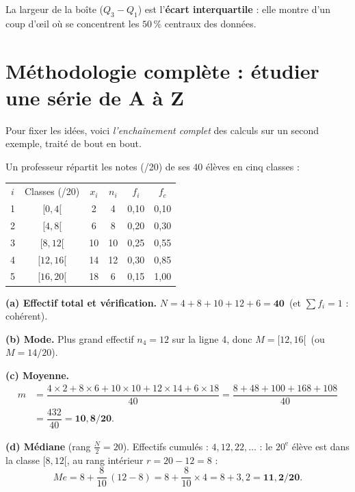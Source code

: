 \documentclass[11pt,a4paper]{article}
\newcommand{\med}{M\!e}                  %
\begin{document}
La largeur de la boîte ($Q_3-Q_1$) est l'\textbf{écart interquartile} : elle montre d'un coup d'œil
où se concentrent les $50\,\%$ centraux des données.

\section{Méthodologie complète : étudier une série de A à Z}
Pour fixer les idées, voici \emph{l'enchaînement complet} des calculs sur un second exemple, traité
de bout en bout.

\begin{exemple}[notes d'un test sur 20, $N=40$ élèves --- fiche]
Un professeur répartit les notes (/20) de ses $40$ élèves en cinq classes :
\begin{center}
\renewcommand{\arraystretch}{1.18}
\begin{tabular}{c c c c c c}
\rowcolor{primary!18}
$i$ & Classes (/20) & $x_i$ & $n_i$ & $f_i$ & $f_c$ \\
1 & $[0,4[$   & 2  & 4  & 0{,}10 & 0{,}10 \\
2 & $[4,8[$   & 6  & 8  & 0{,}20 & 0{,}30 \\
3 & $[8,12[$  & 10 & 10 & 0{,}25 & 0{,}55 \\
4 & $[12,16[$ & 14 & 12 & 0{,}30 & 0{,}85 \\
5 & $[16,20[$ & 18 & 6  & 0{,}15 & 1{,}00 \\
\end{tabular}
\end{center}

\textbf{(a) Effectif total et vérification.}
$N=4+8+10+12+6=\mathbf{40}$ \,(et $\sum f_i=1$ : cohérent).

\textbf{(b) Mode.} Plus grand effectif $n_4=12$ sur la ligne 4, donc $M=[12,16[$ \,(ou $M=14/20$).

\textbf{(c) Moyenne.}
\[
\begin{aligned}
m &= \dfrac{4\times2+8\times6+10\times10+12\times14+6\times18}{40}
   =\dfrac{8+48+100+168+108}{40} \\
  &= \dfrac{432}{40}=\mathbf{10{,}8/20}.
\end{aligned}
\]

\textbf{(d) Médiane} (rang $\tfrac{N}{2}=20$). Effectifs cumulés : $4,12,22,\ldots$ : le
$20^{\text{e}}$ élève est dans la classe $[8,12[$, au rang intérieur $r=20-12=8$ :
\[
\med=8+\frac{8}{10}\,(12-8)=8+\frac{8}{10}\times4=8+3{,}2=\mathbf{11{,}2/20}.
\]


\end{exemple}
\end{document}
